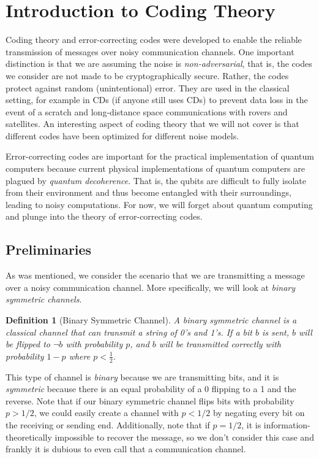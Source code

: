 \documentclass[12pt]{article}
\author{Marika Swanberg}
\newtheorem{definition}{Definition}
\begin{document}
\section{Introduction to Coding Theory} 

Coding theory and error-correcting codes were developed to enable the reliable transmission of messages over noisy communication channels. One important distinction is that we are assuming the noise is \textit{non-adversarial}, that is, the codes we consider are not made to be cryptographically secure. Rather, the codes protect against random (unintentional) error. They are used in the classical setting, for example in CDs (if anyone still uses CDs) to prevent data loss in the event of a scratch and long-distance space communications with rovers and satellites. An interesting aspect of coding theory that we will not cover is that different codes have been optimized for different noise models.

Error-correcting codes are important for the practical implementation of quantum computers because current physical implementations of quantum computers are plagued by \textit{quantum decoherence}. That is, the qubits are difficult to fully isolate from their environment and thus become entangled with their surroundings, leading to noisy computations. For now, we will forget about quantum computing and plunge into the theory of error-correcting codes.

\subsection{Preliminaries}
As was mentioned, we consider the scenario that we are transmitting a message over a noisy communication channel. More specifically, we will look at \textit{binary symmetric channels}.

\begin{definition}[Binary Symmetric Channel] A binary symmetric channel is a classical channel that can transmit a string of 0's and 1's. If a bit $b$ is sent, $b$ will be flipped to $\lnot b$ with probability $p$, and $b$ will be transmitted correctly with probability $1-p$ where $p < \frac{1}{2}$.
\end{definition}

This type of channel is \textit{binary} because we are transmitting bits, and it is \textit{symmetric} because there is an equal probability of a 0 flipping to a 1 and the reverse. Note that if our binary symmetric channel flips bits with probability $p > 1/2$, we could easily create a channel with $p <1/2$ by negating every bit on the receiving or sending end. Additionally, note that if $p=1/2$, it is  information-theoretically impossible to recover the message, so we don't consider this case and frankly it is dubious to even call that a communication channel.
\end{document}
